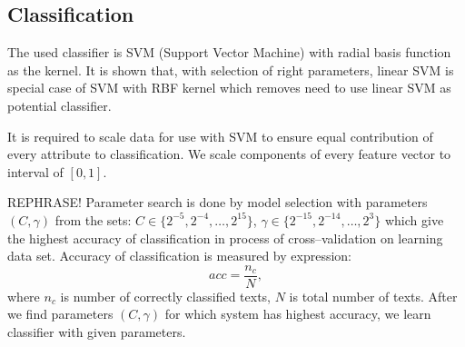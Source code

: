\documentclass[11pt,english]{article}
\begin{document}
\begin{multicols}{2}

\section{Classification}
The used classifier is SVM (Support Vector Machine) with radial basis
function as the kernel. It is shown that, with selection of right parameters, linear
SVM is special case of SVM with RBF kernel \citep{keerthi2003asymptotic} which
removes need to use linear SVM as potential classifier.

It is required to scale data for use with SVM to ensure equal contribution of
every attribute to classification. We scale components of every feature vector
to interval of $[0, 1]$.

REPHRASE!
Parameter search is done by model selection with parameters $(C, \gamma)$ from
the sets: $C \in \{2^{-5}, 2^{-4}, \ldots , 2^{15}\}$, $\gamma \in \{2^{-15}, 2^{-14}, \ldots, 2^3\}$ \citep{CC01a} which give the highest accuracy of
classification in process of cross--validation on learning data set. Accuracy
of classification is measured by expression:
\begin{equation}
acc = \frac{n_c}{N}, %
\end{equation}
where $n_c$ is number of correctly classified texts, $N$ is total number of
texts. After we find parameters $(C, \gamma)$ for which system has highest
accuracy, we learn classifier with given parameters.


\end{multicols}
\end{document}
